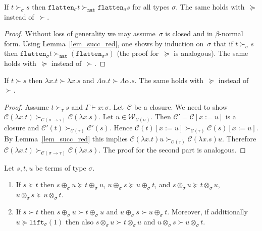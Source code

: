 \documentclass[runningheads,a4paper]{llncs}
\newcommand{\World}{\mathcal{W}}
\newcommand{\cl}{\mathcal{C}}
\newcommand{\arrtype}{\rightarrow}
\newcommand{\abs}[2]{\lambda #1.#2}
\newcommand{\tabs}[2]{\Lambda #1.#2}
\newcommand{\subst}[2]{#1:=#2}
\newcommand{\nat}{\mathtt{nat}}
\newcommand{\flatten}{\mathtt{flatten}}
\newcommand{\lift}{\mathtt{lift}}
\newcommand{\proves}{\vdash}
\begin{document}
\begin{lemma}\label{lem_flatten_succ}
  If $t \succ_\sigma s$ then $\flatten_\sigma t \succ_\nat
  \flatten_\sigma s$ for all types $\sigma$. The same holds
  with~$\succeq$ instead of~$\succ$.
\end{lemma}

\begin{proof}
  Without loss of generality we may assume~$\sigma$ is closed and in
  $\beta$-normal form. Using Lemma~\ref{lem_succ_red}, one shows by
  induction on~$\sigma$ that if $t \succ_\sigma s$ then
  $\flatten_\sigma t \succ_\nat (\flatten_\sigma s)$ (the proof
  for~$\succeq$ is analogous). The same holds with~$\succeq$ instead
  of~$\succ$.
\end{proof}

\begin{lemma}\label{lem_abs_succ}
  If $t \succ s$ then $\abs{x}{t} \succ \abs{x}{s}$ and
  $\tabs{\alpha}{t} \succ \tabs{\alpha}{s}$. The same holds
  with~$\succeq$ instead of~$\succ$.
\end{lemma}

\begin{proof}
  Assume $t \succ_\tau s$ and $\Gamma \proves x : \sigma$. Let~$\cl$
  be a closure. We need to show $\cl(\abs{x}{t})
  \succ_{\cl(\sigma\arrtype\tau)} \cl(\abs{x}{s})$. Let $u \in
  \World_{\cl(\sigma)}$. Then $\cl' = \cl[\subst{x}{u}]$ is a closure
  and $\cl'(t) \succ_{\cl(\tau)} \cl'(s)$. Hence $\cl(t)[\subst{x}{u}]
  \succ_{\cl(\tau)} \cl(s)[\subst{x}{u}]$. By Lemma~\ref{lem_succ_red}
  this implies $\cl(\abs{x}{t}) u \succ_{\cl(\tau)} \cl(\abs{x}{s})
  u$. Therefore $\cl(\abs{x}{t}) \succ_{\cl(\sigma\arrtype\tau)}
  \cl(\abs{x}{s})$. The proof for the second part is analogous.
\end{proof}

\begin{lemma}\label{lem:plustimesmonotonic}
  Let $s,t,u$ be terms of type $\sigma$.
  \begin{enumerate}
  \item If $s \succeq t$ then $s \oplus_\sigma u \succeq t
    \oplus_\sigma u$, $u \oplus_\sigma s \succeq u \oplus_\sigma t$,
    and $s \otimes_\sigma u \succeq t \otimes_\sigma u$, $u
    \otimes_\sigma s \succeq u \otimes_\sigma t$.
  \item If $s \succ t$ then $s \oplus_\sigma u \succ t \oplus_\sigma
    u$ and $u \oplus_\sigma s \succ u \oplus_\sigma t$. Moreover, if
    additionally $u \succeq \lift_\sigma(1)$ then also $s
    \otimes_\sigma u \succ t \otimes_\sigma u$ and $u \otimes_\sigma s
    \succ u \otimes_\sigma t$.
  \end{enumerate}
\end{lemma}
\end{document}
